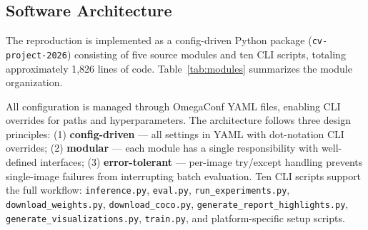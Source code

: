 \documentclass[10pt,journal,final,twocolumn]{IEEEtran}
\begin{document}
\subsection{Software Architecture}

The reproduction is implemented as a config-driven Python package (\texttt{cv-project-2026}) consisting of five source modules and ten CLI scripts, totaling approximately 1,826 lines of code. Table~\ref{tab:modules} summarizes the module organization.

\begin{table}[H]
    \centering
    \caption{Project Module Organization}
    \label{tab:modules}
    \small
\end{table}

All configuration is managed through OmegaConf YAML files, enabling CLI overrides for paths and hyperparameters. The architecture follows three design principles: (1) \textbf{config-driven} — all settings in YAML with dot-notation CLI overrides; (2) \textbf{modular} — each module has a single responsibility with well-defined interfaces; (3) \textbf{error-tolerant} — per-image try/except handling prevents single-image failures from interrupting batch evaluation. Ten CLI scripts support the full workflow: \texttt{inference.py}, \texttt{eval.py}, \texttt{run\_experiments.py}, \texttt{download\_weights.py}, \texttt{download\_coco.py}, \texttt{generate\_report\_highlights.py}, \texttt{generate\_visualizations.py}, \texttt{train.py}, and platform-specific setup scripts.
\end{document}
